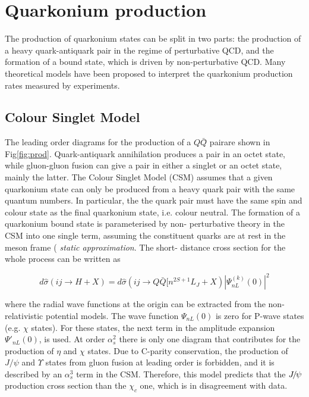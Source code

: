 \section{Quarkonium production}

The production of quarkonium states can be split in two parts: the production
of a heavy quark-antiquark pair in the regime of perturbative QCD, and the
formation of a bound state, which is driven by non-perturbative QCD. Many
theoretical models have been proposed to interpret the quarkonium production
rates measured by experiments.

\subsection{Colour Singlet Model}

The leading order diagrams for the production of a $Q\bar{Q}$̄ pairare shown in
Fig\ref{fig:prod}. Quark-antiquark annihilation produces a pair in an octet
state, while gluon-gluon fusion can give a  pair in either a singlet or an
octet state, mainly the latter. The Colour Singlet Model (CSM) \cite{CSM}
assumes that a given quarkonium state can only be produced from a heavy quark
pair with the same quantum numbers. In particular, the the quark pair must have
the same spin and colour state as the final quarkonium state, i.e. colour
neutral. The formation of a quarkonium bound state is parameterised by non-
perturbative theory in the CSM into one single term, assuming the constituent
quarks are at rest in the meson frame ({\it{ static approximation}}. The short-
distance cross section for the whole process can be written as

\begin{equation}
d{\hat{\sigma}}(ij\rightarrow H + X) = d{\hat{\sigma}}(ij\rightarrow Q{\bar{Q}}[n^{2S+1}L_J + X) 
|\Psi^{(k)}_{nL}(0)|^2
\end{equation}

\noindent where the radial wave functions at the origin can be extracted from
the non-relativistic potential models. The wave function $\Psi_{nL}(0)$ is zero
for P-wave states (e.g. $\chi$ states). For these states, the next term in the
amplitude expansion $\Psi'_{nL}(0)$, is used. At order $\alpha_s^2$ there is
only one diagram that contributes for the production of $\eta$ and $\chi$
states. Due to C-parity conservation, the production of $J/\psi$ and $\Upsilon$
states from gluon fusion at leading order is forbidden, and it is described by
an $\alpha_s^3$ term in the CSM. Therefore, this model predicts that the
${{J\mskip -3mu/\mskip -2mu\psi\mskip 2mu}}$ production cross section than the $\chi_c$ one, which is in
disagreement with data.


